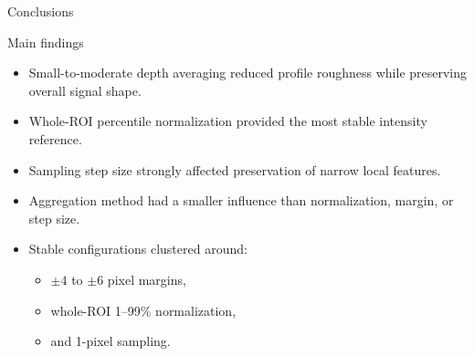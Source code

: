 \documentclass[aspectratio=169]{beamer}
\begin{document}
\begin{frame}{Conclusions}

\begin{block}{Main findings}

\begin{itemize}
    \item Small-to-moderate depth averaging reduced profile roughness while preserving overall signal shape.
    \item Whole-ROI percentile normalization provided the most stable intensity reference.
    \item Sampling step size strongly affected preservation of narrow local features.
    \item Aggregation method had a smaller influence than normalization, margin, or step size.
    \item Stable configurations clustered around:
    \begin{itemize}
        \item $\pm4$ to $\pm6$ pixel margins,
        \item whole-ROI 1--99\% normalization,
        \item and 1-pixel sampling.
    \end{itemize}
\end{itemize}

\end{block}

\end{frame}
\end{document}
